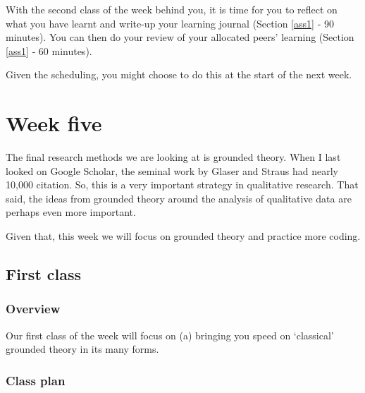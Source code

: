 \documentclass[]{book}
\theoremstyle{definition}
\theoremstyle{definition}
\theoremstyle{definition}
\theoremstyle{remark}
\begin{document}
With the second class of the week behind you, it is time for you to
reflect on what you have learnt and write-up your learning journal
(Section \ref{ass1} ‐ 90 minutes). You can then do your review of your
allocated peers' learning (Section \ref{ass1} ‐ 60 minutes).

Given the scheduling, you might choose to do this at the start of the
next week.

\hypertarget{w5-details}{%
\chapter{Week five}\label{w5-details}}

The final research methods we are looking at is grounded theory. When I
last looked on Google Scholar, the seminal work by Glaser and Straus
\autocite*{glaser_1967_discoverygroundedtheory} had nearly 10,000
citation. So, this is a very important strategy in qualitative research.
That said, the ideas from grounded theory around the analysis of
qualitative data are perhaps even more important.

Given that, this week we will focus on grounded theory and practice more
coding.

\hypertarget{first-class-4}{%
\section*{First class}\label{first-class-4}}

\hypertarget{overview-8}{%
\subsection*{Overview}\label{overview-8}}

Our first class of the week will focus on (a) bringing you speed on
`classical' grounded theory in its many forms.

\hypertarget{class-plan-8}{%
\subsection*{Class plan}\label{class-plan-8}}
\end{document}
